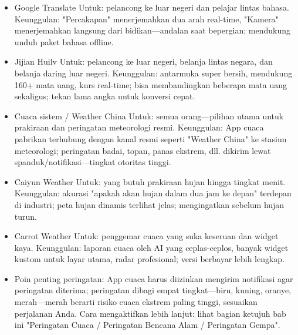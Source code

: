 
\begin{itemize}
  \item Google Translate Untuk: pelancong ke luar negeri dan pelajar lintas bahasa. Keunggulan: "Percakapan" menerjemahkan dua arah real-time, "Kamera" menerjemahkan langsung dari bidikan—andalan saat bepergian; mendukung unduh paket bahasa offline.
\end{itemize}


\begin{itemize}
  \item Jijian Huilv Untuk: pelancong ke luar negeri, belanja lintas negara, dan belanja daring luar negeri. Keunggulan: antarmuka super bersih, mendukung 160+ mata uang, kurs real-time; bisa membandingkan beberapa mata uang sekaligus; tekan lama angka untuk konversi cepat.
\end{itemize}


\begin{itemize}
  \item Cuaca sistem / Weather China Untuk: semua orang—pilihan utama untuk prakiraan dan peringatan meteorologi resmi. Keunggulan: App cuaca pabrikan terhubung dengan kanal resmi seperti "Weather China" ke stasiun meteorologi; peringatan badai, topan, panas ekstrem, dll. dikirim lewat spanduk/notifikasi—tingkat otoritas tinggi.
  \item Caiyun Weather Untuk: yang butuh prakiraan hujan hingga tingkat menit. Keunggulan: akurasi "apakah akan hujan dalam dua jam ke depan" terdepan di industri; peta hujan dinamis terlihat jelas; mengingatkan sebelum hujan turun.
  \item Carrot Weather Untuk: penggemar cuaca yang suka keseruan dan widget kaya. Keunggulan: laporan cuaca oleh AI yang ceplas-ceplos, banyak widget kustom untuk layar utama, radar profesional; versi berbayar lebih lengkap.
  \item Poin penting peringatan: App cuaca harus diizinkan mengirim notifikasi agar peringatan diterima; peringatan dibagi empat tingkat—biru, kuning, oranye, merah—merah berarti risiko cuaca ekstrem paling tinggi, sesuaikan perjalanan Anda. Cara mengaktifkan lebih lanjut: lihat bagian ketujuh bab ini "Peringatan Cuaca / Peringatan Bencana Alam / Peringatan Gempa".
\end{itemize}


